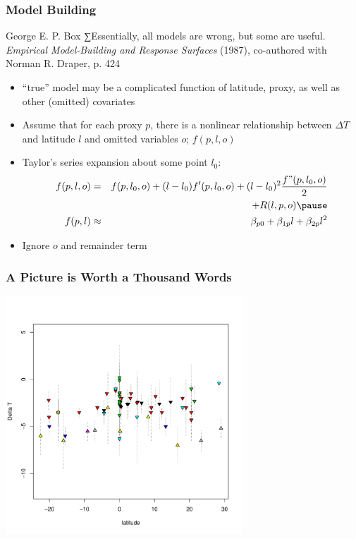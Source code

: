 \documentclass[handout]{beamer}
\begin{document}
\begin{frame}
  \frametitle{Model Building}
  \begin{block}{George E. P. Box}
    ∑Essentially, all models are wrong, but some are useful.
{\it Empirical Model-Building and Response Surfaces} (1987), co-authored with Norman R. Draper, p. 424
  \end{block} \pause
  \begin{itemize}
  \item 
``true'' model may be a complicated function of latitude, proxy, as
well as other (omitted) covariates \pause
\item Assume that for each proxy $p$, there is a nonlinear relationship
  between $\Delta T$ and latitude $l$ and omitted variables $o$; $f(p, l, o)$ \pause
\item Taylor's series expansion about some point $l_0$: 
  \begin{eqnarray*}
 f(p, l, o) & = &f(p, l_0, o) + (l - l_0)f'(p, l_0, o) + (l - l_0)^2 \frac{f"(p,    
  l_0, o)}{2}\\
&  &  + R(l, p, o) \pause \\
f(p, l) & \approx &\beta_{p0} + \beta_{1p} l + \beta_{2p} l^2
\end{eqnarray*} \pause
\item Ignore $o$ and  remainder term
\end{itemize}
\end{frame}
\begin{frame}
  \frametitle{A Picture is Worth a Thousand Words}
\centerline{\includegraphics[height=3.5in]{temp-lat}}
\end{frame}
\end{document}
